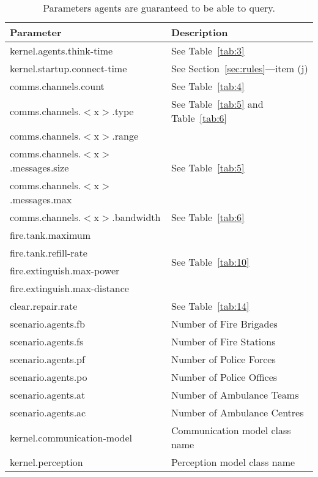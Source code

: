 \documentclass{article}
\begin{document}
\begin{table}[htb]
\caption{Parameters agents are guaranteed to be able to query.}
\label{tab:16}
\centering
\begin{tabular}{ll}
  \hline
  \textbf{Parameter}                    & \textbf{Description} \\
  \hline
  kernel.agents.think-time              & See Table~\ref{tab:3} \\
  \hline
  kernel.startup.connect-time           & See Section~\ref{sec:rules}---item
  (j) \\
  \hline
  comms.channels.count                  & See Table~\ref{tab:4} \\
  \hline
  comms.channels.$<$x$>$.type           & See Table~\ref{tab:5} and
  Table~\ref{tab:6} \\
  \hline
  comms.channels.$<$x$>$.range          & \multirow{3}{*}{See
  Table~\ref{tab:5}} \\
  comms.channels.$<$x$>$.messages.size  & \\
  comms.channels.$<$x$>$.messages.max   & \\
  \hline
  comms.channels.$<$x$>$.bandwidth      & See Table~\ref{tab:6} \\
  \hline
  fire.tank.maximum                     & \multirow{4}{*}{See
  Table~\ref{tab:10}} \\
  fire.tank.refill-rate                 & \\
  fire.extinguish.max-power             & \\
  fire.extinguish.max-distance          & \\
  \hline
  clear.repair.rate                     & See Table~\ref{tab:14} \\
  \hline
  scenario.agents.fb                    & Number of Fire Brigades \\
  \hline
  scenario.agents.fs                    & Number of Fire Stations \\
  \hline
  scenario.agents.pf                    & Number of Police Forces \\
  \hline
  scenario.agents.po                    & Number of Police Offices \\
  \hline
  scenario.agents.at                    & Number of Ambulance Teams \\
  \hline
  scenario.agents.ac                    & Number of Ambulance Centres \\
  \hline
  kernel.communication-model            & Communication model class name \\
  \hline
  kernel.perception                     & Perception model class name \\
  \hline
\end{tabular}
\end{table}
\end{document}
